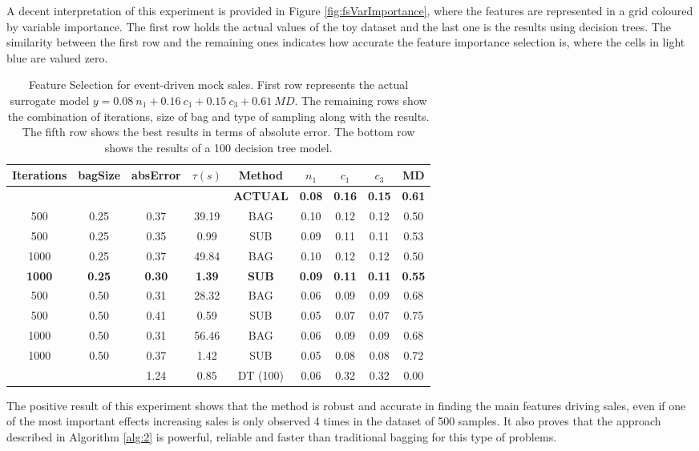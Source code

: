 \documentclass{ieeeaccess}
\begin{document}
%
A decent interpretation of this experiment is provided in Figure \ref{fig:fsVarImportance}, where the features are represented in a grid coloured by variable importance. The first row holds the actual values of the toy dataset and the last one is the results using decision trees. The similarity between the first row and the remaining ones indicates how accurate the feature importance selection is, where the cells in light blue are valued zero. 
%
\begin{table}[t]
 \centering
\resizebox{0.8\textwidth}{!}
{\begin{tabular}{ccccccccc}
\toprule
Iterations & bagSize & absError  & $\tau(s)$ & Method & $n_1$ & $c_1$ & $c_3$ & MD \\
\midrule
  &  & & & \textbf{ACTUAL} & \textbf{0.08} & \textbf{0.16} & \textbf{0.15} & \textbf{0.61} \\
 \hline
 500 & 0.25 & 0.37 & 39.19 & BAG & 0.10 & 0.12 & 0.12 & 0.50 \\
 500 & 0.25 & 0.35 & 0.99 & SUB & 0.09 & 0.11 & 0.11 & 0.53 \\
 1000 & 0.25 & 0.37 & 49.84 & BAG & 0.10 & 0.12 & 0.12 & 0.50 \\
 \textbf{1000} & \textbf{0.25} & \textbf{0.30}  & \textbf{1.39} & \textbf{SUB} & \textbf{0.09} & \textbf{0.11} & \textbf{0.11} & \textbf{0.55} \\
 500 & 0.50 & 0.31  & 28.32 & BAG & 0.06 & 0.09 & 0.09 & 0.68 \\
 500 & 0.50 & 0.41  & 0.59 & SUB & 0.05 & 0.07 & 0.07 & 0.75 \\
 1000 & 0.50 & 0.31  & 56.46 & BAG & 0.06 & 0.09 & 0.09 & 0.68 \\
 1000 & 0.50 & 0.37 & 1.42 & SUB & 0.05 & 0.08 & 0.08 & 0.72 \\
 \hline
  &  & 1.24  & 0.85 & DT (100) & 0.06 & 0.32 & 0.32 & 0.00 \\
\bottomrule
\end{tabular}}
\caption{Feature Selection for event-driven mock sales. First row represents the actual surrogate model $y = 0.08 ~ n_1 + 0.16 ~ c_1 + 0.15 ~ c_3 + 0.61 ~ MD$. The remaining rows show the combination of iterations, size of bag and type of sampling along with the results. The fifth row shows the best results in terms of absolute error. The bottom row shows the results of a 100 decision tree model.} 
\label{tab:Feature Selection}
\end{table}

The positive result of this experiment shows that the method is robust and accurate in finding the main features driving sales, even if one of the most important effects increasing sales is only observed 4 times in the dataset of 500 samples. It also proves that the approach described in Algorithm \ref{alg:2} is powerful, reliable and faster than traditional bagging for this type of problems. 
\end{document}
